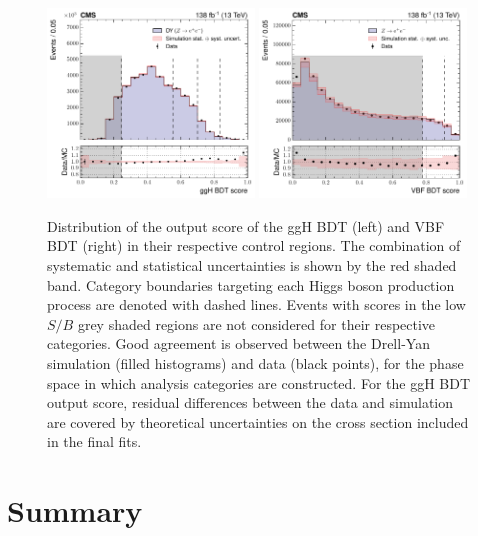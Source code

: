 \begin{figure}[htbp!]
\centering
\includegraphics[width=0.49\textwidth]{Figures/Hee/ggH/validation/DY_validation_ggH_BDT_ggH_mva_paper.pdf}\hfill%
\includegraphics[width=0.49\textwidth]{Figures/Hee/VBF/validation/DY_validation_VBF_BDT_VBF_mva_paper.pdf}\hfill%
\caption[The output score distribution for the \ggH and VBF BDTs for \Zee events in the \Hee control region.]{Distribution of the output score of the ggH BDT (left) and VBF BDT (right) in their respective \Zee control regions. The combination of systematic and statistical uncertainties is shown by the red shaded band. Category boundaries targeting each Higgs boson production process are denoted with dashed lines. Events with scores in the low $S/B$ grey shaded regions are not considered for their respective categories. Good agreement is observed between the Drell-Yan simulation (filled histograms) and data (black points), for the phase space in which analysis categories are constructed.  For the ggH BDT output score, residual differences between the data and simulation are covered by theoretical uncertainties on the \ggH cross section included in the final fits.}%
\label{fig:hee_ggh_vbf_validation}
\end{figure}

\section{Summary}
\label{hee_categorisation_summary}

